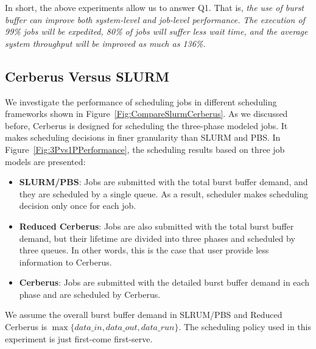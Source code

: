 In short, the above experiments allow us to answer Q1.
That is, \textit{the use of burst buffer can improve both system-level and job-level performance.}
\textit{The execution of 99\% jobs will be expedited, 
80\% of jobs will suffer less wait time,
and the average system throughput will be improved as much as 136\%.}


\subsection{Cerberus Versus SLURM}
\label{Sec:Sim:CerberusVsSlurm}
We investigate the performance of scheduling jobs in different scheduling frameworks shown in Figure~\ref{Fig:CompareSlurmCerberus}.
As we discussed before, Cerberus is designed for scheduling the three-phase modeled jobs. 
It makes scheduling decisions in finer granularity than SLURM and PBS.
In Figure~\ref{Fig:3Pvs1PPerformance}, the scheduling results based on three job models
are presented:
\begin{itemize}
        \item \textbf{SLURM/PBS}: Jobs are submitted with the total burst buffer demand,
        and they are scheduled by a single queue.
	As a result, scheduler makes scheduling decision only once for each job.

        \item \textbf{Reduced Cerberus}: Jobs are also submitted with the total burst buffer demand,
        but their lifetime are divided into three phases and scheduled by three queues.
        In other words, this is the case that user provide less information to Cerberus.
        
        \item \textbf{Cerberus}: Jobs are submitted with the detailed burst buffer demand in each phase and are scheduled by Cerberus.

\end{itemize}
We assume the overall burst buffer demand in SLRUM/PBS and Reduced Cerberus is
$\max \{data\_in, data\_out, data\_run\}$.
The scheduling policy used in this experiment is just first-come first-serve.

